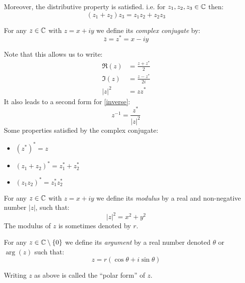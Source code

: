 \documentclass[../main.tex]{subfiles}
\begin{document}
Moreover, the distributive property is satisfied. i.e. for $z_1, z_2, z_3 \in \mathbb{C}$ then:
\[
  (z_1 + z_2)z_3 = z_1 z_2 + z_2 z_3
\]
\begin{definition}
  For any $z \in \mathbb{C}$ with $z = x + iy$ we define its \textit{complex conjugate} by:
  \[
    \bar{z} = z^{*} = x - iy
  \]
\end{definition}
Note that this allows us to write:
\begin{align*}
  \Re(z) &= \frac{z + z^{*}}{2} \\
  \Im(z) &= \frac{z - z^{*}}{2i} \\
  |z|^2 &= z z^{*}
\end{align*}
It also leads to a second form for \cref{inverse}:
\[
  z^{-1} = \frac{z^{*}}{|z|^2}
\]
Some properties satisfied by the complex conjugate:
\begin{itemize}
  \item $(z^{*})^{*} = z$
  \item $(z_1 + z_2)^{*} = z^{*}_{1} + z^{*}_{2}$
  \item $(z_1 z_2)^{*} = z^{*}_{1} z^{*}_{2}$
\end{itemize}
\begin{definition}
  For any $z \in \mathbb{C}$ with $z = x + iy$ we define its \textit{modulus} by a real and non-negative number $|z|$, such that:
  \[
    |z|^2 = x^2 + y^2
  \]
  The modulus of $z$ is sometimes denoted by $r$.
\end{definition}
\begin{definition}
  For any $z \in \mathbb{C} \setminus \{0\}$ we define its \textit{argument} by a real number denoted $\theta$ or $\arg(z)$ such that:
  \[
    z = r(\cos \theta + i \sin \theta)
  \]
\end{definition}
Writing $z$ as above is called the ``polar form'' of $z$.
\end{document}
